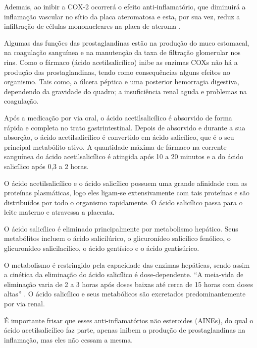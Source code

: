      Ademais, ao inibir a COX-2 ocorrerá o efeito anti-inflamatório, que diminuirá a inflamação vascular no
     sítio da placa ateromatosa e esta, por sua vez, reduz a infiltração de células mononucleares na placa de
     ateroma \cite{Grassi2012}.

     Algumas das funções das prostaglandinas estão na produção do muco estomacal, na coagulação sanguínea e na
     manutenção da taxa de filtração glomerular nos rins. Como o fármaco (ácido acetilsalicílico) inibe as
     enzimas COXs não há a produção das prostaglandinas, tendo como consequências alguns efeitos no organismo.
     Tais como, a úlcera péptica e uma posterior hemorragia digestiva, dependendo da gravidade do quadro; a
     insuficiência renal aguda e problemas na coagulação. 

     Após a medicação por via oral, o ácido acetilsalicílico é absorvido de forma rápida e completa no trato
     gastrintestinal. Depois de absorvido e durante a sua absorção, o ácido acetilsalicílico é convertido em
     ácido salicílico, que é o seu principal metabólito ativo. A quantidade máxima de fármaco na corrente
     sanguínea do ácido acetilsalicílico é atingida após 10 a 20 minutos e a do ácido salicílico após 0,3 a 2
     horas. 

     O ácido acetilsalicílico e o ácido salicílico possuem uma grande afinidade com as proteínas plasmáticas,
     logo eles ligam-se extensivamente com tais proteínas e são distribuídos por todo o organismo rapidamente.
     O ácido salicílico passa para o leite materno e atravessa a placenta.

     O ácido salicílico é eliminado principalmente por metabolismo hepático. Seus metabólitos incluem o ácido
     salicilúrico, o glicuronídeo salicílico fenólico, o glicuronídeo salicilacílico, o ácido gentísico e o
     ácido gentisúrico.

     O metabolismo é restringido pela capacidade das enzimas hepáticas, sendo assim a cinética da eliminação
     do ácido salicílico é dose-dependente. “A meia-vida de eliminação varia de 2 a 3 horas após doses baixas
     até cerca de 15 horas com doses altas” \cite{bulaaspirina}. O ácido salicílico e seus metabólicos são
     excretados predominantemente por via renal. 

     É importante frisar que esses anti-inflamatórios não esteroides (AINEs), do qual o ácido acetilsalicílico
     faz parte, apenas inibem a produção de prostaglandinas na inflamação, mas eles não cessam a mesma.

